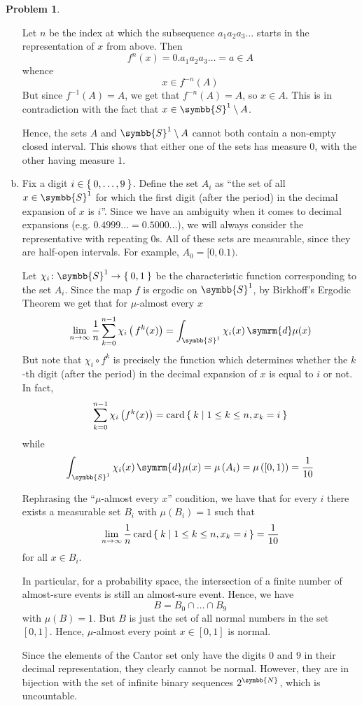 \documentclass[a4paper, 12pt]{article}
\theoremstyle{definition}
\newtheorem{problem}{Problem}
\newcommand*{\naturals}{\symbb{N}}
\newcommand*{\diff}{\mathop{}\!\symrm{d}}
\begin{document}
\begin{problem}
\begin{enumerate}[a)]
    Let \(n\) be the index at which the subsequence \(a_1 a_2 a_3 \dots\) starts in the representation of \(x\) from above. Then
    \[
        f^n (x) = 0. a_1 a_2 a_3 \dots = a \in A
    \]
    whence
    \[
        x \in f^{-n} (A)
    \]
    But since \(f^{-1} (A) = A\), we get that \(f^{-n} (A) = A\), so \(x \in A\). This is in contradiction with the fact that \(x \in \symbb{S}^1 \setminus A\).

    Hence, the sets \(A\) and \(\symbb{S}^1 \setminus A\) cannot both contain a non-empty closed interval. This shows that either one of the sets has measure \(0\), with the other having measure \(1\).

    \item Fix a digit \(i \in \Set{ 0, \dots, 9 }\). Define the set \(A_i\) as ``the set of all \(x \in \symbb{S}^1\) for which the first digit (after the period) in the decimal expansion of \(x\) is \(i\)''.
    Since we have an ambiguity when it comes to decimal expansions (e.g. \(0.4999\dots = 0.5000\dots\)), we will always consider the representative with repeating \(0\)s. All of these sets are measurable, since they are half-open intervals. For example, \(A_0 = [0, 0.1)\).

    Let \(\chi_i \colon \symbb{S}^1 \to \Set{0, 1}\) be the characteristic function corresponding to the set \(A_i\). Since the map \(f\) is ergodic on \(\symbb{S}^1\), by Birkhoff's Ergodic Theorem we get that for \(\mu\)-almost every \(x\)
    \[
        \lim_{n \to \infty} \frac{1}{n} \sum_{k = 0}^{n - 1} \chi_i\left(\, f^k (x)\right) = \int_{\symbb{S}^1} \chi_i(x) \diff \mu(x)
    \]
    But note that \(\chi_i \circ f^k\) is precisely the function which determines whether the \(k\)-th digit (after the period) in the decimal expansion of \(x\) is equal to \(i\) or not. In fact,
    \[
        \sum_{k = 0}^{n - 1} \chi_i \left(f^{k} (x)\right) = \operatorname{card} \Set{ k | 1 \leq k \leq n, x_k = i }
    \]
    while
    \[
        \int_{\symbb{S}^1} \chi_i(x) \diff \mu(x) = \mu \left(A_i\right) = \mu \left([0, 1)\right) = \frac{1}{10}
    \]

    Rephrasing the ``\(\mu\)-almost every \(x\)'' condition, we have that for every \(i\) there exists a measurable set \(B_i\) with \(\mu\left(B_i\right) = 1\) such that
    \[
        \lim_{n \to \infty} \frac{1}{n} \operatorname{card} \Set{ k | 1 \leq k \leq n, x_k = i } = \frac{1}{10}
    \]
    for all \(x \in B_i\).

    In particular, for a probability space, the intersection of a finite number of almost-sure events is still an almost-sure event. Hence, we have
    \[
        B = B_0 \cap \dots \cap B_9
    \]
    with \(\mu\left(B\right) = 1\). But \(B\) is just the set of all normal numbers in the set \([0, 1]\). Hence, \(\mu\)-almost every point \(x \in [0, 1]\) is normal.

    Since the elements of the Cantor set only have the digits \(0\) and \(9\) in their decimal representation, they clearly cannot be normal. However, they are in bijection with the set of infinite binary sequences \(2^{\naturals}\), which is uncountable.
\end{enumerate}
\end{problem}
\end{document}

